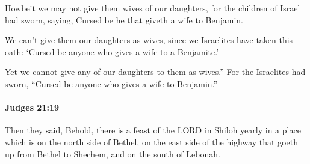 			\begin{versebox}
					\item[BHS] 
					\item[ASV] Howbeit we may not give them wives of our daughters, for the children of Israel had sworn, saying, Cursed be he that giveth a wife to Benjamin.
					\item[NIV] We can’t give them our daughters as wives, since we Israelites have taken this oath: ‘Cursed be anyone who gives a wife to a Benjamite.’
					\item[NRSV] Yet we cannot give any of our daughters to them as wives.” For the Israelites had sworn, “Cursed be anyone who gives a wife to Benjamin.”
			\end{versebox}

		\paragraph{Judges 21:19} %
			\label{JUDGES-21-19}

			Then they said, Behold, there is a feast of the LORD in Shiloh yearly in a place which is on the north side of Bethel, on the east side of the highway that goeth up from Bethel to Shechem, and on the south of Lebonah.


